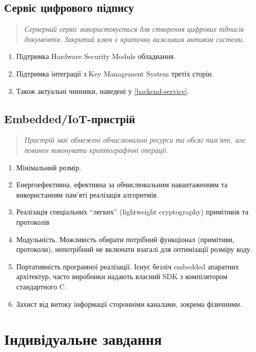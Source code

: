 \documentclass{kpi-lab}
\begin{document}
\section{Сервіс цифрового підпису}
\begin{quote}\small\it
  Серверний сервіс використовується для створення цифрових
  підписів документів. Закритий ключ є критично важливим
  активом системи.
\end{quote}
\begin{enumerate}
  \item Підтримка Hardware Security Module обладнання.
  \item Підтримка інтеграції з Key Management System третіх сторін.
  \item Також актуальні чинники, наведені у \ref{backend-service}.
\end{enumerate}

\section{Embedded/IoT-пристрій}
\begin{quote}\small\it
  Пристрій має обмежені обчислювальні ресурси та обсяг
  пам'яті, але повинен виконувати криптографічні операції.
\end{quote}
\begin{enumerate}
  \item Мінімальний розмір.
  \item Енергоефективна, ефективна за обчислювальним навантаженням та
    використанням пам'яті реалізація алгоритмів.
  \item Реалізація спеціальних \enquote{легких}
    (lightweight cryptography) примітивів та протоколів
  \item Модульність. Можливість обирати потрібний
    функціонал (примітиви, протоколи),
    непотрібний не включати взагалі для оптимізації розміру коду.
  \item Портативність програмної реалізації.
    Існує безліч embedded апаратних архітектур,
    часто виробники надають власний SDK з компілятором
    стандартного C.
  \item Захист від витоку інформації сторонніми каналами,
    зокрема фізичними.
\end{enumerate}

\chapter{Індивідуальне завдання}
\end{document}
